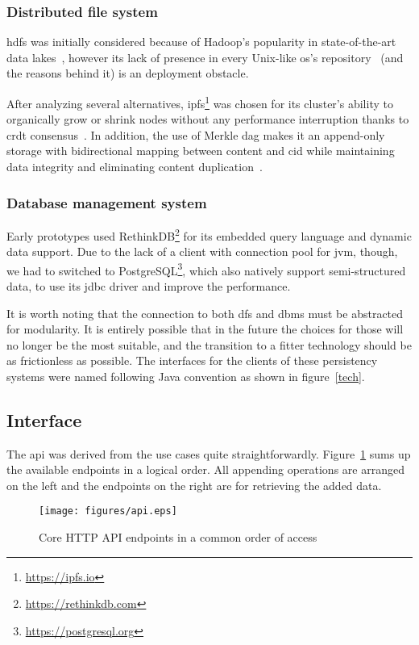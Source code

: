 \subsubsection{Distributed file system}
\gls{hdfs} was initially considered because of Hadoop's popularity
in state-of-the-art data lakes~\cite{lake}, however its lack of presence
in every Unix-like \gls{os}'s repository~\cite{hdfs} (and the reasons behind it)
is an deployment obstacle.

After analyzing several alternatives, \gls{ipfs}\footnote{\url{https://ipfs.io}}
was chosen for its cluster's ability to organically grow or shrink nodes
without any performance interruption thanks to \gls{crdt} consensus~\cite{crdt}.
In addition, the use of Merkle \gls{dag} makes it an append-only storage
with bidirectional mapping between content and \gls{cid} while maintaining
data integrity and eliminating content duplication~\cite{ipfs}.

\subsubsection{Database management system}
Early prototypes used RethinkDB\footnote{\url{https://rethinkdb.com}}
for its embedded query language and dynamic data support.  Due to the lack
of a client with connection pool for \gls{jvm}, though, we had to switched
to PostgreSQL\footnote{\url{https://postgresql.org}}, which also natively support
semi-structured data, to use its \gls{jdbc} driver and improve the performance.

It is worth noting that the connection to both \gls{dfs} and \gls{dbms}
must be abstracted for modularity.  It is entirely possible that in the future
the choices for those will no longer be the most suitable, and the transition
to a fitter technology should be as frictionless as possible.  The interfaces
for the clients of these persistency systems were named following
Java convention as shown in figure~\ref{tech}.

\subsection{Interface}
The \gls{api} was derived from the use cases quite straightforwardly.
Figure~\ref{api} sums up the available endpoints in a logical order.
All appending operations are arranged on the left and the endpoints
on the right are for retrieving the added data.
\begin{figure}
  \texttt{[image: figures/api.eps]}
  \caption{Core HTTP API endpoints in a common order of access}
  \label{api}
\end{figure}

